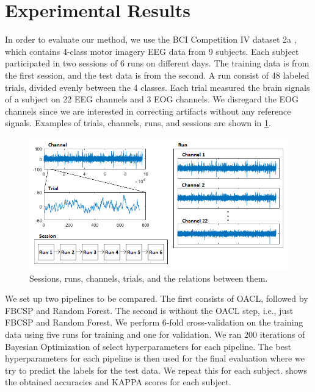 \section{Experimental Results}

In order to evaluate our method, we use the BCI Competition IV dataset 2a \citep{brunner2008bci}, which contains 4-class motor imagery EEG data from 9 subjects. Each subject participated in two sessions of 6 runs on different days. The training data is from the first session, and the test data is from the second. A run consist of 48 labeled trials, divided evenly between the 4 classes. Each trial measured the brain signals of a subject on 22 EEG channels and 3 EOG channels. We disregard the EOG channels since we are interested in correcting artifacts without any reference signals. Examples of trials, channels, runs, and sessions are shown in \cref{fig:dataset}.

\begin{figure}
	\centering
	\begin{adjustbox}{width=\textwidth}
		\includegraphics{figures/bciiv2a.png}
	\end{adjustbox}
	\caption{Sessions, runs, channels, trials, and the relations between them.}
	\label{fig:dataset}
\end{figure}

We set up two pipelines to be compared. The first consists of OACL, followed by FBCSP and Random Forest. The second is without the OACL step, i.e., just FBCSP and Random Forest. We perform 6-fold cross-validation on the training data using five runs for training and one for validation. We ran 200 iterations of Bayesian Optimization of select hyperparameters for each pipeline. The best hyperparameters for each pipeline is then used for the final evaluation where we try to predict the labels for the test data. We repeat this for each subject.  shows the obtained accuracies and KAPPA scores for each subject.

